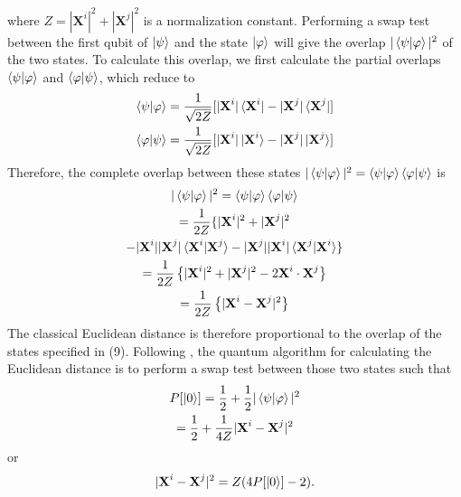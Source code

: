 \documentclass[twocolumn, english]{revtex4-2}
\begin{document}
where $Z = |\textbf{X}^{i}|^2+|\textbf{X}^{j}|^2$ is a normalization constant. Performing a swap test between the first qubit of $\ket{\psi}$ and the state $\ket{\varphi}$ will give the overlap $|\braket{\psi|\varphi}|^2$ of the two states. To calculate this overlap, we first calculate the partial overlaps $\braket{\psi|\varphi}$ and $\braket{\varphi|\psi}$, which reduce to
\begin{equation}\begin{gathered}
\braket{\psi|\varphi} = \frac{1}{\sqrt{2Z}}[|\textbf{X}^{i}|\bra{\textbf{X}^{i}} - |\textbf{X}^{j}|\bra{\textbf{X}^{j}}]\\
\braket{\varphi|\psi} = \frac{1}{\sqrt{2Z}}[|\textbf{X}^{i}|\ket{\textbf{X}^{i}} - |\textbf{X}^{j}|\ket{\textbf{X}^{j}}]
\end{gathered}\end{equation}
Therefore, the complete overlap between these states $|\braket{\psi|\varphi}|^{2} = \braket{\psi|\varphi}\braket{\varphi|\psi}$ is
\begin{equation}\begin{gathered}
|\braket{\psi|\varphi}|^{2} = \braket{\psi|\varphi}\braket{\varphi|\psi}\\
=\frac{1}{2Z}\{|\textbf{X}^{i}|^2+|\textbf{X}^{j}|^2\\-|\textbf{X}^{i}||\textbf{X}^{j}|\braket{\textbf{X}^{i}|\textbf{X}^{j}}-|\textbf{X}^{j}||\textbf{X}^{i}|\braket{\textbf{X}^{j}|\textbf{X}^{i}}\}\\
=\frac{1}{2Z}\left\{|\textbf{X}^{i}|^2+|\textbf{X}^{j}|^2-2\textbf{X}^{i}\cdot\textbf{X}^{j}\right\}\\
=\frac{1}{2Z}\left\{|\textbf{X}^{i}-\textbf{X}^{j}|^2\right\}
\end{gathered}\end{equation}
The classical Euclidean distance is therefore proportional to the overlap of the states specified in (9). Following \cite{lloydlearning}, the quantum algorithm for calculating the Euclidean distance is to perform a swap test between those two states such that
\begin{equation}\begin{gathered}
P[\ket{0}] =  \frac{1}{2}+\frac{1}{2}|\braket{\psi|\varphi}|^2\\
= \frac{1}{2} + \frac{1}{4Z}|\textbf{X}^{i}-\textbf{X}^{j}|^2
\end{gathered}\end{equation}
or
\begin{equation}
|\textbf{X}^{i}-\textbf{X}^{j}|^2=Z(4P[\ket{0}]-2).
\end{equation}
\end{document}
